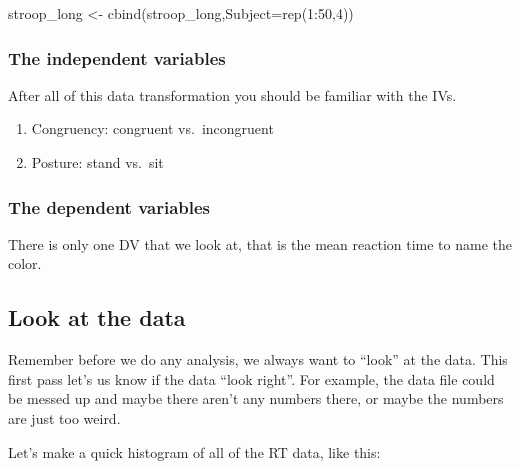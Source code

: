 \documentclass[
]{book}
\newenvironment{Shaded}{\begin{snugshade}}{\end{snugshade}}
\newcommand{\AttributeTok}[1]{\textcolor[rgb]{0.77,0.63,0.00}{#1}}
\newcommand{\DecValTok}[1]{\textcolor[rgb]{0.00,0.00,0.81}{#1}}
\newcommand{\FunctionTok}[1]{\textcolor[rgb]{0.00,0.00,0.00}{#1}}
\newcommand{\NormalTok}[1]{#1}
\newcommand{\OtherTok}[1]{\textcolor[rgb]{0.56,0.35,0.01}{#1}}
\newcommand{\SpecialCharTok}[1]{\textcolor[rgb]{0.00,0.00,0.00}{#1}}
\providecommand{\tightlist}{%
  \setlength{\itemsep}{0pt}\setlength{\parskip}{0pt}}
\begin{document}
\begin{Shaded}
\begin{Highlighting}[]
\NormalTok{stroop\_long }\OtherTok{\textless{}{-}} \FunctionTok{cbind}\NormalTok{(stroop\_long,}\AttributeTok{Subject=}\FunctionTok{rep}\NormalTok{(}\DecValTok{1}\SpecialCharTok{:}\DecValTok{50}\NormalTok{,}\DecValTok{4}\NormalTok{))}
\end{Highlighting}
\end{Shaded}

\hypertarget{the-independent-variables}{%
\subsubsection{The independent variables}\label{the-independent-variables}}

After all of this data transformation you should be familiar with the IVs.

\begin{enumerate}
\def\labelenumi{\arabic{enumi}.}
\tightlist
\item
  Congruency: congruent vs.~incongruent
\item
  Posture: stand vs.~sit
\end{enumerate}

\hypertarget{the-dependent-variables-1}{%
\subsubsection{The dependent variables}\label{the-dependent-variables-1}}

There is only one DV that we look at, that is the mean reaction time to name the color.

\hypertarget{look-at-the-data-4}{%
\subsection{Look at the data}\label{look-at-the-data-4}}

Remember before we do any analysis, we always want to ``look'' at the data. This first pass let's us know if the data ``look right''. For example, the data file could be messed up and maybe there aren't any numbers there, or maybe the numbers are just too weird.

Let's make a quick histogram of all of the RT data, like this:

\begin{Shaded}
\end{Shaded}
\end{document}
